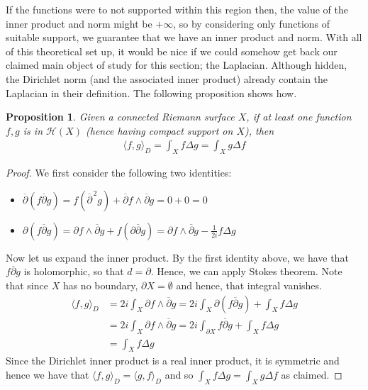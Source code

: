 \documentclass[11pt]{report}
\newtheorem{prop}[thm]{Proposition}
\theoremstyle{definition}
\begin{document}
If the functions were to not supported within this region then, the value of the inner product and norm might be $+\infty$, so by considering only functions of suitable support, we guarantee that we have an inner product and norm. With all of this theoretical set up, it would be nice if we could somehow get back our claimed main object of study for this section; the Laplacian. Although hidden, the Dirichlet norm (and the associated inner product) already contain the Laplacian in their definition. The following proposition shows how.

\begin{prop}\label{InnerLaplacian}
  Given a connected Riemann surface $X$, if at least one function $f,g$ is in $\mathcal{H}(X)$ (hence having compact support on $X$), then 
  \begin{align*}
    \langle f, g \rangle_D = \int_X f \Delta g = \int_X g \Delta f
  \end{align*}
\end{prop}
\begin{proof}
  We first consider the following two identities:
  \begin{itemize}
    \item $\overline{\partial}(f\overline{\partial}g) = f (\overline{\partial}^{\, 2} g) + \overline{\partial}f \wedge \overline{\partial}g = 0 + 0 = 0$
    \item $\partial(f\overline{\partial}g)=\partial f \wedge \overline{\partial}g + f(\partial\overline{\partial}g)=\partial f \wedge \overline{\partial}g - \frac{1}{2i}f\Delta g$
  \end{itemize}
  Now let us expand the inner product. By the first identity above, we have that $f\overline{\partial}g$ is holomorphic, so that $d = \partial$. Hence, we can apply Stokes theorem. Note that since $X$ has no boundary, $\partial X = \emptyset$ and hence, that integral vanishes.
  \begin{align*}
    \langle f, g \rangle_D &= 2i\int_X \partial f \wedge \overline{\partial}g = 2i\int_X \partial(f\overline{\partial}g)+\int_X f\Delta g \\
    &= 2i\int_X \partial f \wedge \overline{\partial}g = 2i\int_{\partial X} f\overline{\partial}g + \int_X f\Delta g \\
    &= \int_X f\Delta g
  \end{align*}
  Since the Dirichlet inner product is a real inner product, it is symmetric and hence we have that $\langle f, g \rangle_D = \langle g, f \rangle_D $ and so $\int_X f\Delta g = \int_X g \Delta f$ as claimed.
\end{proof}
\end{document}
